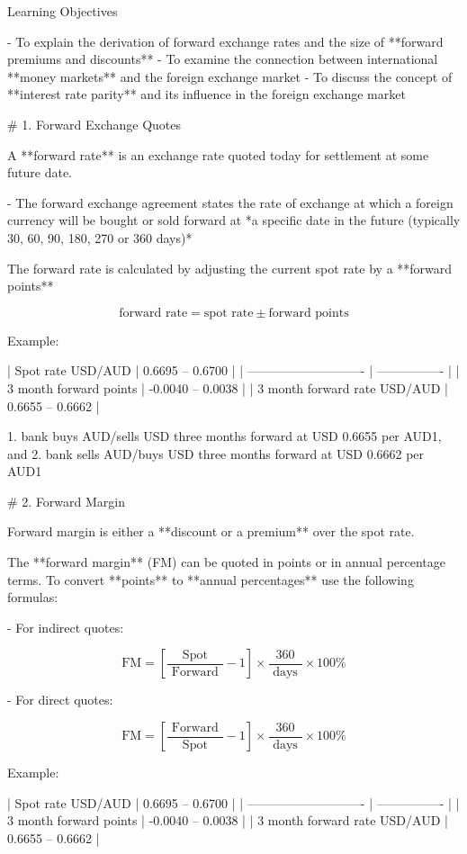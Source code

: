 Learning Objectives

- To explain the derivation of forward exchange rates and the size of **forward premiums and discounts**
- To examine the connection between international **money markets** and the foreign exchange market
- To discuss the concept of **interest rate parity** and its influence in the foreign exchange market

# 1. Forward Exchange Quotes

A **forward rate** is an exchange rate quoted today for settlement at some future date.

- The forward exchange agreement states the rate of exchange at which a foreign currency will be bought or sold forward at *a specific date in the future (typically 30, 60, 90, 180, 270 or 360 days)*

The forward rate is calculated by adjusting the current spot rate by a **forward points**

$$
\text{forward rate} = \text{spot rate} \pm \text{forward points}
$$

Example:

| Spot rate USD/AUD            | 0.6695 – 0.6700  |
| ---------------------------- | ---------------- |
| 3 month forward points       | -0.0040 – 0.0038 |
| 3 month forward rate USD/AUD | 0.6655 – 0.6662  |

1. bank buys AUD/sells USD three months forward at USD 0.6655 per AUD1, and
2. bank sells AUD/buys USD three months forward at USD 0.6662 per AUD1


# 2. Forward Margin

Forward margin is either a **discount or a premium** over the spot rate.

The **forward margin** (FM) can be quoted in points or in annual percentage terms. To convert **points** to **annual percentages** use the following formulas:

- For indirect quotes:

$$ 
\text{FM}=\left[\frac{\text { Spot }}{\text { Forward }}-1 \right] \times \frac{360}{\text { days }} \times 100\%
$$

- For direct quotes:

$$ 
\text{FM}=\left[\frac{\text { Forward }}{\text { Spot }}-1 \right] \times \frac{360}{\text { days }} \times 100\%
$$

Example:

| Spot rate USD/AUD            | 0.6695 – 0.6700  |
| ---------------------------- | ---------------- |
| 3 month forward points       | -0.0040 – 0.0038 |
| 3 month forward rate USD/AUD | 0.6655 – 0.6662  |

